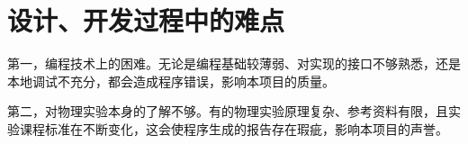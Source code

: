 \section{设计、开发过程中的难点}

第一，编程技术上的困难。无论是编程基础较薄弱、对实现的接口不够熟悉，还是本地调试不充分，都会造成程序错误，影响本项目的质量。

第二，对物理实验本身的了解不够。有的物理实验原理复杂、参考资料有限，且实验课程标准在不断变化，这会使程序生成的报告存在瑕疵，影响本项目的声誉。